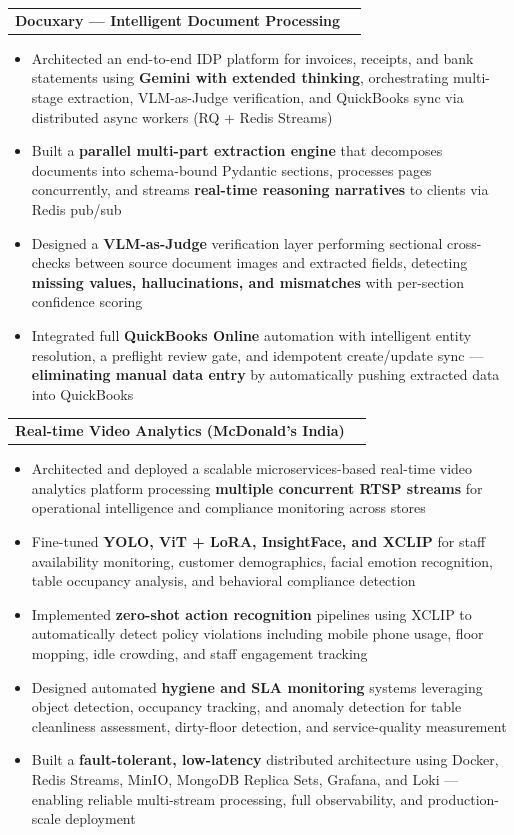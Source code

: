 \documentclass[letterpaper,11pt]{article}
\makeatletter
\newcommand{\resumeItem}[1]{
  \item\small{
    {#1 \vspace{-1pt}}
  }
}
\newcommand{\resumeSubSubheading}[2]{
    \item
    \begin{tabular*}{\textwidth}{l@{\extracolsep{\fill}}r}
      \textcolor{accent}{\faAngleRight}\hspace{4pt}\textbf{\small #1} & {\color{dark-grey}\small #2} \\
    \end{tabular*}\vspace{-5pt}
}
\newcommand{\resumeItemListStart}{\begin{itemize}}
\newcommand{\resumeItemListEnd}{\end{itemize}\vspace{0pt}}
\makeatother
\begin{document}
      \resumeSubSubheading{Docuxary --- Intelligent Document Processing}{}
      \resumeItemListStart
        \resumeItem{Architected an end-to-end IDP platform for invoices, receipts, and bank statements using \textbf{Gemini with extended thinking}, orchestrating multi-stage extraction, VLM-as-Judge verification, and QuickBooks sync via distributed async workers (RQ + Redis Streams)}
        \resumeItem{Built a \textbf{parallel multi-part extraction engine} that decomposes documents into schema-bound Pydantic sections, processes pages concurrently, and streams \textbf{real-time reasoning narratives} to clients via Redis pub/sub}
        \resumeItem{Designed a \textbf{VLM-as-Judge} verification layer performing sectional cross-checks between source document images and extracted fields, detecting \textbf{missing values, hallucinations, and mismatches} with per-section confidence scoring}
        \resumeItem{Integrated full \textbf{QuickBooks Online} automation with intelligent entity resolution, a preflight review gate, and idempotent create/update sync --- \textbf{eliminating manual data entry} by automatically pushing extracted data into QuickBooks}
      \resumeItemListEnd

      \resumeSubSubheading{Real-time Video Analytics (McDonald's India)}{}
      \resumeItemListStart
        \resumeItem{Architected and deployed a scalable microservices-based real-time video analytics platform processing \textbf{multiple concurrent RTSP streams} for operational intelligence and compliance monitoring across stores}
        \resumeItem{Fine-tuned \textbf{YOLO, ViT + LoRA, InsightFace, and XCLIP} for staff availability monitoring, customer demographics, facial emotion recognition, table occupancy analysis, and behavioral compliance detection}
        \resumeItem{Implemented \textbf{zero-shot action recognition} pipelines using XCLIP to automatically detect policy violations including mobile phone usage, floor mopping, idle crowding, and staff engagement tracking}
        \resumeItem{Designed automated \textbf{hygiene and SLA monitoring} systems leveraging object detection, occupancy tracking, and anomaly detection for table cleanliness assessment, dirty-floor detection, and service-quality measurement}
        \resumeItem{Built a \textbf{fault-tolerant, low-latency} distributed architecture using Docker, Redis Streams, MinIO, MongoDB Replica Sets, Grafana, and Loki --- enabling reliable multi-stream processing, full observability, and production-scale deployment}
      \resumeItemListEnd
\end{document}
